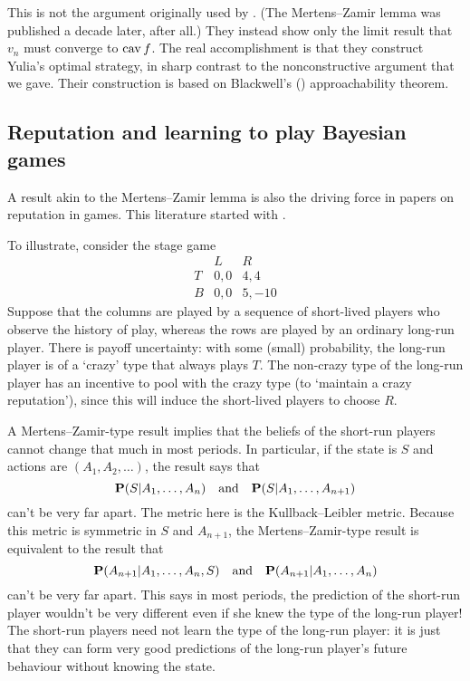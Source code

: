 \documentclass[11pt,letterpaper,reqno,oneside]{article}
\begin{document}
This is not the argument originally used by \textcite{AumannMaschler1995}. (The Mertens--Zamir lemma was published a decade later, after all.) They instead show only the limit result that $v_n$ must converge to $\operatorname*{cav} f$. The real accomplishment is that they construct Yulia's optimal strategy, in sharp contrast to the nonconstructive argument that we gave. Their construction is based on Blackwell's (\citeyear{Blackwell1956}) approachability theorem.



\subsection{Reputation and learning to play Bayesian games}
\label{sec:learning:reputation_learning}

A result akin to the Mertens--Zamir lemma is also the driving force in papers on reputation in games. This literature started with \textcite{KrepsEtAl1982,FudenbergLevine1989,FudenbergLevine1992}.

To illustrate, consider the stage game
%
\begin{equation*}
	\begin{array}{c|ccc}
		  & L & R \\ \hline
		T & 0,0 & 4,4 \\
		B & 0,0 & 5,-10
	\end{array} 
\end{equation*}
%
Suppose that the columns are played by a sequence of short-lived players who observe the history of play, whereas the rows are played by an ordinary long-run player. There is payoff uncertainty: with some (small) probability, the long-run player is of a `crazy' type that always plays $T$. The non-crazy type of the long-run player has an incentive to pool with the crazy type (to `maintain a crazy reputation'), since this will induce the short-lived players to choose $R$.

A Mertens--Zamir-type result implies that the beliefs of the short-run players cannot change that much in most periods. In particular, if the state is $S$ and actions are $(A_1,A_2,\dots)$, the result says that
%
\begin{equation*}
	\mathbf{P}( S | A_1,\dots,A_n )
	\quad\text{and}\quad
	\mathbf{P}( S | A_1,\dots,A_{n+1} )
\end{equation*}
%
can't be very far apart. The metric here is the Kullback--Leibler metric. Because this metric is symmetric in $S$ and $A_{n+1}$, the Mertens--Zamir-type result is equivalent to the result that
%
\begin{equation*}
	\mathbf{P}( A_{n+1} | A_1,\dots,A_n,S )
	\quad\text{and}\quad
	\mathbf{P}( A_{n+1} | A_1,\dots,A_n )
\end{equation*}
%
can't be very far apart. This says in most periods, the prediction of the short-run player wouldn't be very different even if she knew the type of the long-run player! The short-run players need not learn the type of the long-run player: it is just that they can form very good predictions of the long-run player's future behaviour without knowing the state.
\end{document}
